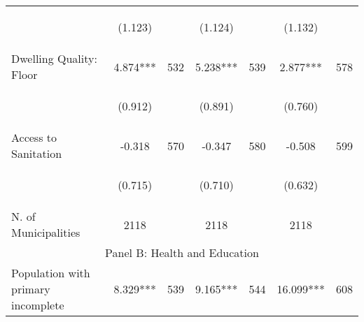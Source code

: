 \begin{tabular}{lcccccc}
\vspace{4pt} &  \begin{footnotesize}(1.123)\end{footnotesize}   & &
			    \begin{footnotesize}(1.124)\end{footnotesize}   & &
			    \begin{footnotesize}(1.132)\end{footnotesize}   &
			     \\          



Dwelling Quality: Floor   &  4.874***   &  532  &   5.238***  &  539 &  2.877***  &  578   \\

\vspace{4pt} &  \begin{footnotesize}(0.912)\end{footnotesize}   & &
			    \begin{footnotesize}(0.891)\end{footnotesize}   & &
			    \begin{footnotesize}(0.760)\end{footnotesize}   &
			     \\          

Access to Sanitation   &  -0.318   &  570  &   -0.347  &  580 &  -0.508  &  599   \\

\vspace{4pt} &  \begin{footnotesize}(0.715)\end{footnotesize}   & &
			    \begin{footnotesize}(0.710)\end{footnotesize}   & &
			    \begin{footnotesize}(0.632)\end{footnotesize}   &
			     \\          

N. of Municipalities  &   2118   &  &  2118    & &  2118  &    \\

\hline		
\multicolumn{7}{c}{Panel B: Health and Education}   \\                                                          


Population with primary incomplete   &  8.329***   &  539  &   9.165***  &  544 &  16.099***  &  608   \\



\end{tabular}
